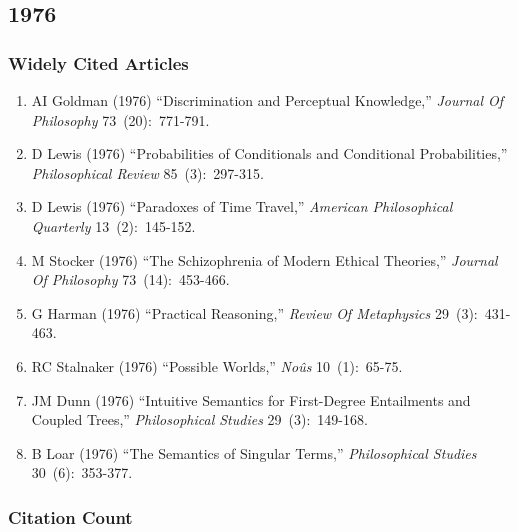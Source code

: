 \documentclass[
  10pt,
  letterpaper,
  DIV=11,
  numbers=noendperiod,
  twoside]{scrartcl}
\providecommand{\tightlist}{%
  \setlength{\itemsep}{0pt}\setlength{\parskip}{0pt}}\usepackage{longtable,booktabs,array}
\begin{document}
\newpage

\subsection{1976}\label{sec-s1976}

\subsubsection*{Widely Cited Articles}\label{widely-cited-articles-20}

\begin{enumerate}
\def\labelenumi{\arabic{enumi}.}
\tightlist
\item
  AI Goldman (1976) ``Discrimination and Perceptual Knowledge,''
  \emph{Journal Of Philosophy} 73~(20):~771-791.
\item
  D Lewis (1976) ``Probabilities of Conditionals and Conditional
  Probabilities,'' \emph{Philosophical Review} 85~(3):~297-315.
\item
  D Lewis (1976) ``Paradoxes of Time Travel,'' \emph{American
  Philosophical Quarterly} 13~(2):~145-152.
\item
  M Stocker (1976) ``The Schizophrenia of Modern Ethical Theories,''
  \emph{Journal Of Philosophy} 73~(14):~453-466.
\item
  G Harman (1976) ``Practical Reasoning,'' \emph{Review Of Metaphysics}
  29~(3):~431-463.
\item
  RC Stalnaker (1976) ``Possible Worlds,'' \emph{Noûs} 10~(1):~65-75.
\item
  JM Dunn (1976) ``Intuitive Semantics for First-Degree Entailments and
  Coupled Trees,'' \emph{Philosophical Studies} 29~(3):~149-168.
\item
  B Loar (1976) ``The Semantics of Singular Terms,'' \emph{Philosophical
  Studies} 30~(6):~353-377.
\end{enumerate}

\subsubsection*{Citation Count}\label{sec-count-1976}
\end{document}
